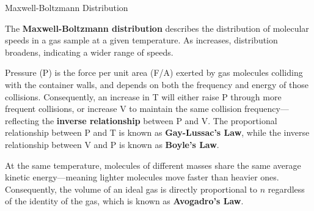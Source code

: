 \documentclass[10pt]{article}
\begin{document}
    \begin{core}[label=core:max_boltz_dis]{Maxwell-Boltzmann Distribution}

      The \textbf{Maxwell-Boltzmann distribution} describes the distribution of molecular speeds in a gas sample at a given temperature. As  increases, distribution broadens, indicating a wider range of speeds.


      Pressure (P) is the force per unit area (F/A) exerted by gas molecules colliding with the container walls, and depends on both the frequency and energy of those collisions. Consequently, an increase in T will either raise P through more frequent collisions, or increase V to maintain the same collision frequency---reflecting the \textbf{inverse relationship} between P and V. The proportional relationship between P and T is known as \textbf{Gay-Lussac's Law}, while the inverse relationship between V and P is known as \textbf{Boyle's Law}.

      At the same temperature, molecules of different masses share the same average kinetic energy---meaning lighter molecules move faster than heavier ones. Consequently, the volume of an ideal gas is directly proportional to $n$ regardless of the identity of the gas, which is known as \textbf{Avogadro's Law}.


\end{core}
\end{document}
